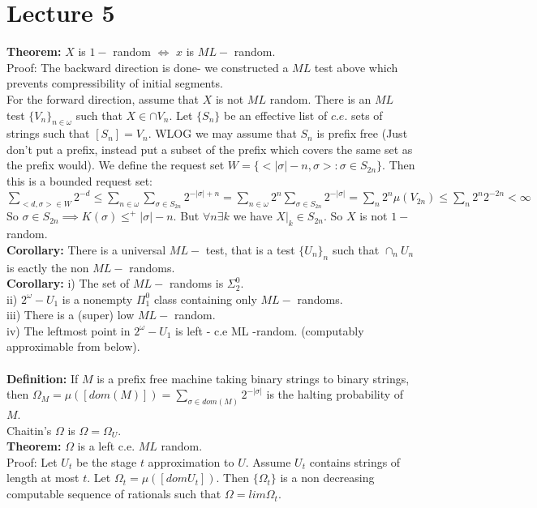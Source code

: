 \documentclass{article}
\begin{document}
	\section{Lecture 5}
	\textbf{Theorem:} $X$ is $1-$ random $\iff$ $x$ is $ML-$ random.\\
	Proof: The backward direction is done- we constructed a  $ML$ test above which prevents compressibility of initial segments.\\
	For the forward direction, assume that $X$ is not $ML$ random. There is an $ML$ test $\{V_n\}_{n\in \omega}$ such that $X \in \cap V_n$. Let $\{S_n\}$ be an effective list of $c.e.$ sets of strings such that $[S_n] = V_n$. WLOG we may assume that $S_n$ is prefix free (Just don't put a prefix, instead put a subset of the prefix which covers the same set as the prefix would). We define the request set $W = \{<|\sigma|-n, \sigma> : \sigma \in S_{2n}\}$. Then this is a bounded request set:\\ 
	$\sum_{<d,\sigma> \in W} 2^{-d} \leq \sum_{n\in \omega} \sum_{\sigma \in S_{2n}} 2^{-|\sigma|+n} = \sum_{n\in \omega} 2^n \sum_{\sigma \in S_{2n}} 2^{-|\sigma|} = \sum_n 2^n\mu(V_{2n}) \leq \sum_n 2^n 2^{-2n} < \infty$
		So $\sigma \in S_{2n} \implies K(\sigma)\leq^+ |\sigma| - n$. But $\forall n \exists k$ we have $X|_k \in S_{2n}$. So $X$ is not $1-$ random.\\
		\textbf{Corollary:} There is a universal $ML-$ test, that is a test $\{U_n\}_n$ such that $\cap_n U_n$ is eactly the non $ML-$ randoms. \\
		\textbf{Corollary:} i) The set of $ML-$ randoms is $\Sigma^0_2$.\\
		ii) $2^\omega - U_1$ is a nonempty $\Pi^0_1$ class containing only $ML-$ randoms.\\
		iii) There is a (super) low $ML-$ random.\\
		iv) The leftmost point in $2^\omega - U_1$ is left - c.e ML -random. (computably approximable from below).\\
		\\
		\textbf{Definition:} If $M$ is a prefix free machine taking binary strings to binary strings, then $\Omega_M = \mu([dom(M)]) = \sum_{\sigma \in dom(M)} 2^{-|\sigma|}$ is the halting probability of $M$.\\
		Chaitin's $\Omega$ is $\Omega = \Omega_U$.\\
		\textbf{Theorem:} $\Omega$ is a left c.e. $ML$ random.\\
		Proof: Let $U_t$ be the stage $t$ approximation to $U$. Assume $U_t $ contains strings of length at most $t$. Let $\Omega_t = \mu([dom U_t])$. Then $\{\Omega_t\}$ is a non decreasing computable sequence of rationals such that $\Omega = lim \Omega_t$.
\end{document}
